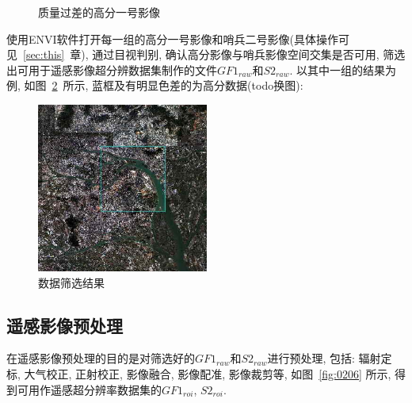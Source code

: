 \begin{figure}[!htbp]
    \centering
    \quad
    \caption{质量过差的高分一号影像}
    \label{fig:0205}
\end{figure}

使用ENVI软件打开每一组的高分一号影像和哨兵二号影像(具体操作可见~\ref{sec:this}~章), 通过目视判别, 确认高分影像与哨兵影像空间交集是否可用, 筛选出可用于遥感影像超分辨数据集制作的文件$GF1_{raw}$和$S2_{raw}$. 以其中一组的结果为例, 如图~\ref{fig:0208}~所示, 蓝框及有明显色差的为高分数据(todo换图):

\begin{figure}[!htbp]
    \centering
    \includegraphics[height=15em]{pic/chap02-08.jpg}
    \caption{数据筛选结果}
    \label{fig:0208}
\end{figure}

\subsection{遥感影像预处理}
在遥感影像预处理的目的是对筛选好的$GF1_{raw}$和$S2_{raw}$进行预处理, 包括: 辐射定标, 大气校正, 正射校正, 影像融合, 影像配准, 影像裁剪等, 如图~\ref{fig:0206} 所示, 得到可用作遥感超分辨率数据集的$GF1_{roi}$, $S2_{roi}$. 

